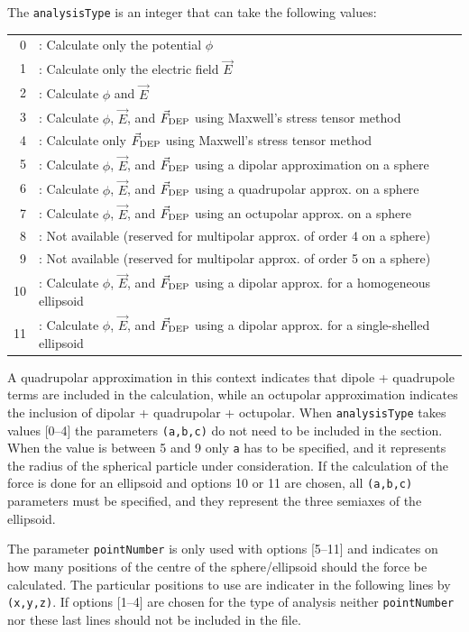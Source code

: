 \documentclass[12pt]{report}
\begin{document}
The \verb+analysisType+ is an integer that can take the following values:

\begin{tabular}{rl}
0&: Calculate only the potential $\phi$\\
1&: Calculate only the electric field $\vec{E}$\\
2&: Calculate $\phi$ and $\vec{E}$\\
3&: Calculate $\phi$, $\vec{E}$, and $\vec{F}_{\rm DEP}$ using Maxwell's stress tensor method\\
4&: Calculate only $\vec{F}_{\rm DEP}$ using Maxwell's stress tensor method\\
5&: Calculate $\phi$, $\vec{E}$, and $\vec{F}_{\rm DEP}$ using a dipolar approximation on a sphere\\
6&: Calculate $\phi$, $\vec{E}$, and $\vec{F}_{\rm DEP}$ using a quadrupolar approx. on a sphere\\
7&: Calculate $\phi$, $\vec{E}$, and $\vec{F}_{\rm DEP}$ using an octupolar approx. on a sphere\\
8&: Not available (reserved for multipolar approx. of order 4 on a sphere)\\
9&: Not available (reserved for multipolar approx. of order 5 on a sphere)\\
10&: Calculate $\phi$, $\vec{E}$, and $\vec{F}_{\rm DEP}$ using a dipolar approx. for a homogeneous ellipsoid\\
11&: Calculate $\phi$, $\vec{E}$, and $\vec{F}_{\rm DEP}$ using a dipolar approx. for a single-shelled ellipsoid
\end{tabular}

A quadrupolar approximation in this context indicates that dipole + quadrupole terms are included in the calculation, while an octupolar approximation indicates the inclusion of dipolar + quadrupolar + octupolar. When \verb+analysisType+ takes values [0--4] the parameters \verb+(a,b,c)+ do not need to be included in the section. When the value is between 5 and 9 only \verb+a+ has to be specified, and it represents the radius of the spherical particle under consideration. If the calculation of the force is done for an ellipsoid and options 10 or 11 are chosen, all \verb+(a,b,c)+ parameters must be specified, and they represent the three semiaxes of the ellipsoid. 

The parameter \verb+pointNumber+ is only used with options [5--11] and indicates on how many positions of the centre of the sphere/ellipsoid should the force be calculated. The particular positions to use are indicater in the following lines by \verb+(x,y,z)+. If options [1--4] are chosen for the type of analysis neither \verb+pointNumber+ nor these last lines should not be included in the file. 
\end{document}
